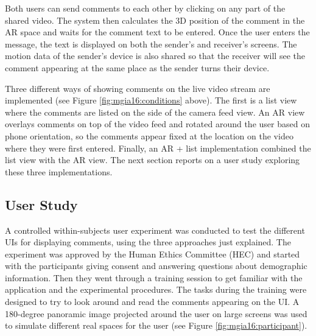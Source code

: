 Both users can send comments to each other by clicking on any part of the shared video. The system then calculates the 3D position of the comment in the AR space and waits for the comment text to be entered. Once the user enters the message, the text is displayed on both the sender's and receiver's screens. The motion data of the sender's device is also shared so that the receiver will see the comment appearing at the same place as the sender turns their device. 

Three different ways of showing comments on the live video stream are implemented (see Figure \ref{fig:mgia16:conditions} above). The first is a list view where the comments are listed on the side of the camera feed view. An AR view overlays comments on top of the video feed and rotated around the user based on phone orientation, so the comments appear fixed at the location on the video where they were first entered. Finally, an AR + list implementation combined the list view with the AR view. The next section reports on a user study exploring these three implementations.


\subsection{User Study}

A controlled within-subjects user experiment was conducted to test the different UIs for displaying comments, using the three approaches just explained. The experiment was approved by the Human Ethics Committee (HEC) and started with the participants giving consent and answering questions about demographic information. Then they went through a training session to get familiar with the application and the experimental procedures. The tasks during the training were designed to try to look around and read the comments appearing on the UI. A 180-degree panoramic image projected around the user on large screens was used to simulate different real spaces for the user (see Figure \ref{fig:mgia16:participant}). 

